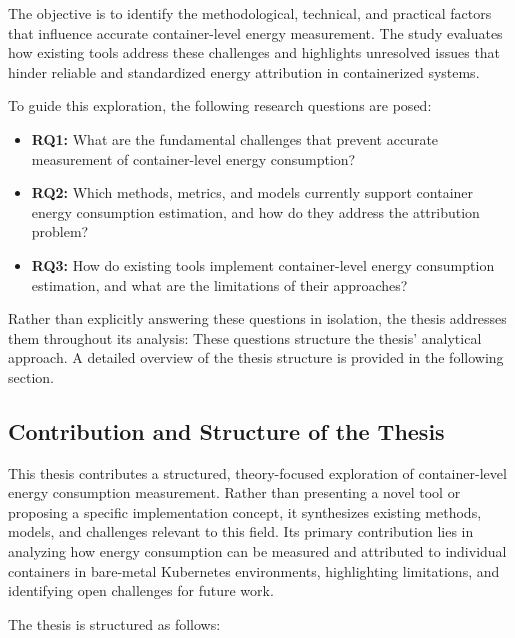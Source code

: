 The objective is to identify the methodological, technical, and practical factors that influence accurate container-level energy measurement. The study evaluates how existing tools address these challenges and highlights unresolved issues that hinder reliable and standardized energy attribution in containerized systems.

To guide this exploration, the following research questions are posed:

\begin{itemize}
\item \textbf{RQ1:} What are the fundamental challenges that prevent accurate measurement of container-level energy consumption?
\item \textbf{RQ2:} Which methods, metrics, and models currently support container energy consumption estimation, and how do they address the attribution problem?
\item \textbf{RQ3:} How do existing tools implement container-level energy consumption estimation, and what are the limitations of their approaches?
\end{itemize}

Rather than explicitly answering these questions in isolation, the thesis addresses them throughout its analysis: These questions structure the thesis’ analytical approach. A detailed overview of the thesis structure is provided in the following section.

\subsection{Contribution and Structure of the Thesis}

This thesis contributes a structured, theory-focused exploration of container-level energy consumption measurement. Rather than presenting a novel tool or proposing a specific implementation concept, it synthesizes existing methods, models, and challenges relevant to this field. Its primary contribution lies in analyzing how energy consumption can be measured and attributed to individual containers in bare-metal Kubernetes environments, highlighting limitations, and identifying open challenges for future work.

The thesis is structured as follows:

